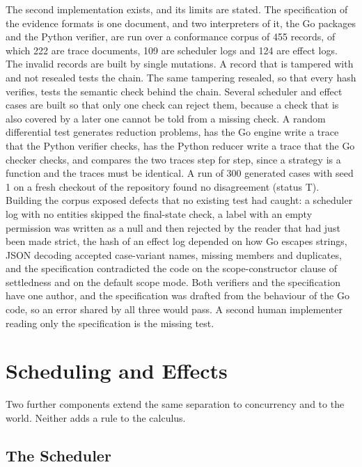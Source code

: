 \documentclass[11pt]{article}
\theoremstyle{definition}
\theoremstyle{remark}
\newcommand{\Tt}{status T}
\begin{document}
The second implementation exists, and its limits are stated. The specification of the evidence formats is one document, and two interpreters of it, the Go packages and the Python verifier, are run over a conformance corpus of 455 records, of which 222 are trace documents, 109 are scheduler logs and 124 are effect logs. The invalid records are built by single mutations. A record that is tampered with and not resealed tests the chain. The same tampering resealed, so that every hash verifies, tests the semantic check behind the chain. Several scheduler and effect cases are built so that only one check can reject them, because a check that is also covered by a later one cannot be told from a missing check. A random differential test generates reduction problems, has the Go engine write a trace that the Python verifier checks, has the Python reducer write a trace that the Go checker checks, and compares the two traces step for step, since a strategy is a function and the traces must be identical. A run of 300 generated cases with seed 1 on a fresh checkout of the repository found no disagreement (\Tt). Building the corpus exposed defects that no existing test had caught: a scheduler log with no entities skipped the final-state check, a label with an empty permission was written as a null and then rejected by the reader that had just been made strict, the hash of an effect log depended on how Go escapes strings, JSON decoding accepted case-variant names, missing members and duplicates, and the specification contradicted the code on the scope-constructor clause of settledness and on the default scope mode. Both verifiers and the specification have one author, and the specification was drafted from the behaviour of the Go code, so an error shared by all three would pass. A second human implementer reading only the specification is the missing test.

\section{Scheduling and Effects}\label{sec:sched}

Two further components extend the same separation to concurrency and to the world. Neither adds a rule to the calculus.

\subsection{The Scheduler}
\end{document}
